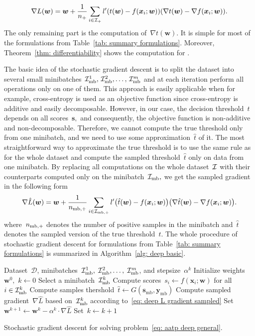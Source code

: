 \begin{equation}\label{eq: deep L gradient true}
  \nabla L(\bm{w})
    = \bm{w} + \frac{1}{\npos} \sum_{i \in \Ipos} l'\Brac{t(\bm{w}) - f(\bm{x}_i; \bm{w})}\Brac{\nabla t(\bm{w}) - \nabla f(\bm{x}_i; \bm{w})}.
\end{equation}
The only remaining part is the computation of~$\nabla t(\bm{w})$. It is simple for most of the formulations from Table~\ref{tab: summary formulations}. Moreover, Theorem~\ref{thm: differentiability} shows the computation for \PatMat.

The basic idea of the stochastic gradient descent is to split the dataset into several small minibatches~$\mathcal{I}_{\text{mb}}^1, \, \mathcal{I}_{\text{mb}}^2, \ldots, \, \mathcal{I}_{\text{mb}}^m$ and at each iteration perform all operations only on one of them. This approach is easily applicable when for example, cross-entropy is used as an objective function since cross-entropy is additive and easily decomposable. However, in our case, the decision threshold~$t$ depends on all scores~$\bm{s},$ and consequently, the objective function is non-additive and non-decomposable. Therefore, we cannot compute the true threshold only from one minibatch, and we need to use some approximation~$\hat{t}$ of it. The most straightforward way to approximate the true threshold is to use the same rule as for the whole dataset and compute the sampled threshold~$\hat{t}$ only on data from one minibatch. By replacing all computations on the whole dataset~$\mathcal{I}$ with their counterparts computed only on the minibatch~$\mathcal{I}_{\text{mb}},$ we get the sampled gradient in the following form
\begin{equation}\label{eq: deep L gradient sampled}
  \nabla \hat{L}(\bm{w})
    = \bm{w} + \frac{1}{\nmbpos} \sum_{i \in \Imbpos} l'\Brac{\hat{t}(\bm{w}) - f(\bm{x}_i; \bm{w})}\Brac{\nabla \hat{t}(\bm{w}) - \nabla f(\bm{x}_i; \bm{w})}.
\end{equation}
where~$n_{\text{mb},+}$ denotes the number of positive samples in the minibatch and~$\hat{t}$ denotes the sampled version of the true threshold~$t.$ The whole procedure of stochastic gradient descent for formulations from Table~\ref{tab: summary formulations} is summarized in Algorithm~\ref{alg: deep basic}.

\begin{algorithm}
  \centering
  \begin{algorithmic}[1]
    \Require Dataset~$\mathcal{D}$, minibatches~$\mathcal{I}_{\text{mb}}^1,\; \mathcal{I}_{\text{mb}}^2, \ldots, \; \mathcal{I}_{\text{mb}}^m$, and stepsize~$\alpha^k$
    \State Initialize weights~$\bm{w}^0,$ $k \gets 0$
    \Repeat
    \State Select a minibatch~$\mathcal{I}_{\text{mb}}^k$
    \State Compute scores~$s_i \gets f(\bm{x}_i; \bm{w})$ for all~$i \in \mathcal{I}_{\text{mb}}^k$
    \State Compute samples thershold~$\hat{t} \gets G(\bm{s}_{\text{mb}}, \bm{y}_{\text{mb}})$
    \State Compute sampled gradient~$\nabla \hat{L}$ based on~$\mathcal{I}_{\text{mb}}^k$ according to~\eqref{eq: deep L gradient sampled}
    \State Set~$\bm{w}^{k+1} \gets \bm{w}^k - \alpha^k \cdot \nabla \hat{L}$
    \State Set~$k \gets k + 1$
  \end{algorithmic}
  \caption{Stochastic gradient descent for solving problem~\eqref{eq: aatp deep general}.}
  \label{alg: deep basic}
\end{algorithm}

